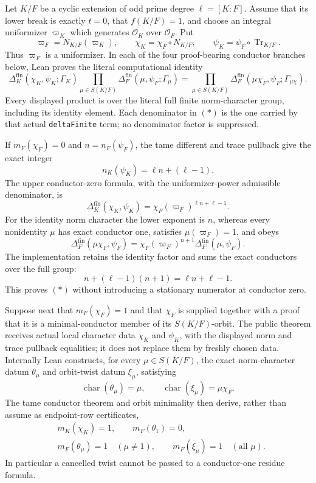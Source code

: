 \begin{theorem}\label{mod:cases-tameodd}
Let $K/F$ be a cyclic extension of odd prime degree
$\ell=[K:F]$.  Assume that its lower break is exactly $t=0$, that
$f(K/F)=1$, and choose an integral uniformizer $\varpi_K$ which generates
$\mathcal O_K$ over $\mathcal O_F$.  Put
\[
 \varpi_F=N_{K/F}(\varpi_K),\qquad
 \chi_K=\chi_F\circ N_{K/F},\qquad
 \psi_K=\psi_F\circ\operatorname{Tr}_{K/F}.
\]
Thus $\varpi_F$ is a uniformizer.  In each of the four proof-bearing
conductor branches below, Lean proves the literal computational identity
\[
 \Delta_K^{\mathrm{fin}}(\chi_K,\psi_K;\Gamma_K)
 \prod_{\mu\in S(K/F)}
   \Delta_F^{\mathrm{fin}}(\mu,\psi_F;\Gamma_\mu)
 =
 \prod_{\mu\in S(K/F)}
   \Delta_F^{\mathrm{fin}}(\mu\chi_F,\psi_F;\Gamma_{\mu\chi}).
 \tag{*}
\]
Every displayed product is over the literal full finite norm-character
group, including its identity element.  Each denominator in $(*)$ is the
one carried by that actual \texttt{deltaFinite} term; no denominator factor
is suppressed.

If $m_F(\chi_F)=0$ and $n=n_F(\psi_F)$, the tame different and trace
pullback give the exact integer
\[
 n_K(\psi_K)=\ell n+(\ell-1).
\]
The upper conductor-zero formula, with the uniformizer-power admissible
denominator, is
\[
 \Delta_K^{\mathrm{fin}}(\chi_K,\psi_K)
   =\chi_F(\varpi_F)^{\ell n+\ell-1}.
\]
For the identity norm character the lower exponent is $n$, whereas every
nonidentity $\mu$ has exact conductor one, satisfies $\mu(\varpi_F)=1$,
and obeys
\[
 \Delta_F^{\mathrm{fin}}(\mu\chi_F,\psi_F)
 =\chi_F(\varpi_F)^{n+1}
   \Delta_F^{\mathrm{fin}}(\mu,\psi_F).
\]
The implementation retains the identity factor and sums the exact
conductors over the full group:
\[
 n+(\ell-1)(n+1)=\ell n+\ell-1.
\]
This proves $(*)$ without introducing a stationary numerator at conductor
zero.

Suppose next that $m_F(\chi_F)=1$ and that $\chi_F$ is supplied together
with a proof that it is a minimal-conductor member of its $S(K/F)$-orbit.
The public theorem receives actual local character data $\chi_K$ and
$\psi_K$, with the displayed norm and trace pullback equalities; it does not
replace them by freshly chosen data.  Internally Lean constructs, for every
$\mu\in S(K/F)$, the exact norm-character datum $\theta_\mu$ and orbit-twist
datum $\xi_\mu$, satisfying
\[
 \operatorname{char}(\theta_\mu)=\mu,\qquad
 \operatorname{char}(\xi_\mu)=\mu\chi_F.
\]
The tame conductor theorem and orbit minimality then derive, rather than
assume as endpoint-row certificates,
\[
 \begin{aligned}
  &m_K(\chi_K)=1,\qquad m_F(\theta_1)=0,\\
  &m_F(\theta_\mu)=1\quad(\mu\ne1),\qquad
    m_F(\xi_\mu)=1\quad(\text{all }\mu).
 \end{aligned}
\]
In particular a cancelled twist cannot be passed to a conductor-one
residue formula.


\end{theorem}
